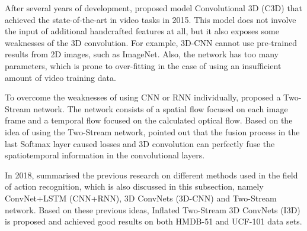 
After several years of development, \citet{tran2015learning} proposed model Convolutional 3D (C3D) that achieved the state-of-the-art in video tasks in 2015.
This model does not involve the input of additional handcrafted features at all, but it also exposes some weaknesses of the 3D convolution.
For example, 3D-CNN cannot use pre-trained results from 2D images, such as ImageNet.
Also, the network has too many parameters, which is prone to over-fitting in the case of using an insufficient amount of video training data.

To overcome the weaknesses of using CNN or RNN individually, \citet{simonyan2014twostream} proposed a Two-Stream network.
The network consists of a spatial flow focused on each image frame and a temporal flow focused on the calculated optical flow.
Based on the idea of using the Two-Stream network, \citet{feichtenhofer2016convolutional} pointed out that the fusion process in the last Softmax layer caused losses and 3D convolution can perfectly fuse the spatiotemporal information in the convolutional layers.

In 2018, \citet{carreira2018quo} summarised the previous research on different methods used in the field of action recognition, which is also discussed in this subsection, namely ConvNet+LSTM (CNN+RNN), 3D ConvNets (3D-CNN) and Two-Stream network.
Based on these previous ideas, Inflated Two-Stream 3D ConvNets (I3D) is proposed and achieved good results on both HMDB-51 and UCF-101 data sets.